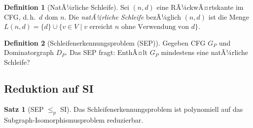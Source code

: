 ﻿\documentclass[a4paper,12pt]{article}
\theoremstyle{definition}
\newtheorem{definition}{Definition}
\newtheorem{satz}{Satz}
\begin{document}
\begin{definition}[NatÃ¼rliche Schleife]
\label{def:ns}
Sei $(n, d)$ eine RÃ¼ckwÃ¤rtskante im CFG, d.\,h.\ $d$ dom $n$. Die \emph{natÃ¼rliche Schleife} bezÃ¼glich $(n, d)$ ist die Menge $L(n,d) = \{d\} \cup \{v \in V \mid v \text{ erreicht } n \text{ ohne Verwendung von } d\}$.
\end{definition}

\begin{definition}[Schleifenerkennungsproblem (SEP)]
\label{def:sep}
Gegeben CFG $G_P$ und Dominatorgraph $D_P$. Das SEP fragt: EnthÃ¤lt $G_P$ mindestens eine natÃ¼rliche Schleife?
\end{definition}

\subsection{Reduktion auf SI}

\begin{satz}[SEP $\leq_p$ SI]
\label{satz:sep-si}
Das Schleifenerkennungsproblem ist polynomiell auf das Subgraph-Isomorphismusproblem reduzierbar.
\end{satz}
\end{document}
